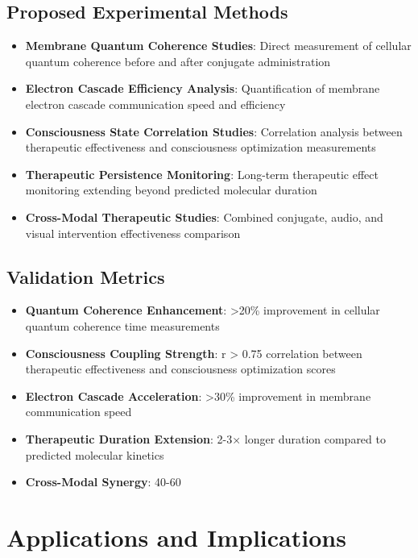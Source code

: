 \documentclass[12pt,a4paper]{article}
\begin{document}
\subsection{Proposed Experimental Methods}

\begin{itemize}
\item \textbf{Membrane Quantum Coherence Studies}: Direct measurement of cellular quantum coherence before and after conjugate administration
\item \textbf{Electron Cascade Efficiency Analysis}: Quantification of membrane electron cascade communication speed and efficiency
\item \textbf{Consciousness State Correlation Studies}: Correlation analysis between therapeutic effectiveness and consciousness optimization measurements
\item \textbf{Therapeutic Persistence Monitoring}: Long-term therapeutic effect monitoring extending beyond predicted molecular duration
\item \textbf{Cross-Modal Therapeutic Studies}: Combined conjugate, audio, and visual intervention effectiveness comparison
\end{itemize}

\subsection{Validation Metrics}

\begin{itemize}
\item \textbf{Quantum Coherence Enhancement}: >20\% improvement in cellular quantum coherence time measurements
\item \textbf{Consciousness Coupling Strength}: r > 0.75 correlation between therapeutic effectiveness and consciousness optimization scores
\item \textbf{Electron Cascade Acceleration}: >30\% improvement in membrane communication speed
\item \textbf{Therapeutic Duration Extension}: 2-3× longer duration compared to predicted molecular kinetics
\item \textbf{Cross-Modal Synergy}: 40-60%
\end{itemize}

\section{Applications and Implications}
\end{document}
